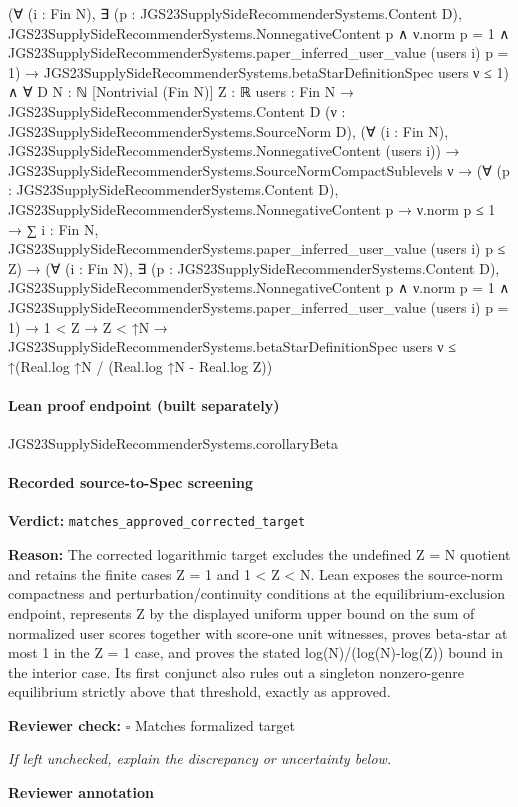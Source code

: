 \documentclass[10pt]{article}
\newcommand{\reviewerbox}{%
  \par\noindent\fbox{\parbox{0.96\linewidth}{\rule{0pt}{0.38in}}}\par
}
\newcommand{\reviewmatch}[1]{%
  \par\noindent\textbf{Reviewer check:} $\square$\; #1\par
  \noindent\emph{If left unchecked, explain the discrepancy or uncertainty below.}\par
}
\begin{document}
\begin{ReviewVerbatim}
            (∀ (i : Fin N),
                ∃ (p : JGS23SupplySideRecommenderSystems.Content D),
                  JGS23SupplySideRecommenderSystems.NonnegativeContent p ∧
                    ν.norm p = 1 ∧ JGS23SupplySideRecommenderSystems.paper_inferred_user_value (users i) p = 1) →
              JGS23SupplySideRecommenderSystems.betaStarDefinitionSpec users ν ≤ 1) ∧
    ∀ {D N : ℕ} [Nontrivial (Fin N)] {Z : ℝ} {users : Fin N → JGS23SupplySideRecommenderSystems.Content D}
      (ν : JGS23SupplySideRecommenderSystems.SourceNorm D),
      (∀ (i : Fin N), JGS23SupplySideRecommenderSystems.NonnegativeContent (users i)) →
        JGS23SupplySideRecommenderSystems.SourceNormCompactSublevels ν →
          (∀ (p : JGS23SupplySideRecommenderSystems.Content D),
              JGS23SupplySideRecommenderSystems.NonnegativeContent p →
                ν.norm p ≤ 1 →
                  ∑ i : Fin N, JGS23SupplySideRecommenderSystems.paper_inferred_user_value (users i) p ≤ Z) →
            (∀ (i : Fin N),
                ∃ (p : JGS23SupplySideRecommenderSystems.Content D),
                  JGS23SupplySideRecommenderSystems.NonnegativeContent p ∧
                    ν.norm p = 1 ∧ JGS23SupplySideRecommenderSystems.paper_inferred_user_value (users i) p = 1) →
              1 < Z →
                Z < ↑N →
                  JGS23SupplySideRecommenderSystems.betaStarDefinitionSpec users ν ≤
                    ↑(Real.log ↑N / (Real.log ↑N - Real.log Z))
\end{ReviewVerbatim}

\paragraph{Lean proof endpoint (built separately)}\begin{ReviewVerbatim}
JGS23SupplySideRecommenderSystems.corollaryBeta
\end{ReviewVerbatim}

\paragraph{Recorded source-to-Spec screening}
\textbf{Verdict:} \texttt{matches\_approved\_corrected\_target}
\\
{\raggedright
\textbf{Reason:} The corrected logarithmic target excludes the undefined Z = N quotient and retains the finite cases Z = 1 and 1 < Z < N.\allowbreak{} Lean exposes the source-\allowbreak{}norm compactness and perturbation/\allowbreak{}continuity conditions at the equilibrium-\allowbreak{}exclusion endpoint, represents Z by the displayed uniform upper bound on the sum of normalized user scores together with score-\allowbreak{}one unit witnesses, proves beta-\allowbreak{}star at most 1 in the Z = 1 case, and proves the stated log(N)/\allowbreak{}(log(N)-\allowbreak{}log(Z)) bound in the interior case.\allowbreak{} Its first conjunct also rules out a singleton nonzero-\allowbreak{}genre equilibrium strictly above that threshold, exactly as approved.\allowbreak{}
\par}
\reviewmatch{Matches formalized target}
\noindent\textbf{Reviewer annotation}\par
\reviewerbox
\clearpage
\hypertarget{source-claim-f113ecd861da6d9e}{}
\end{document}
